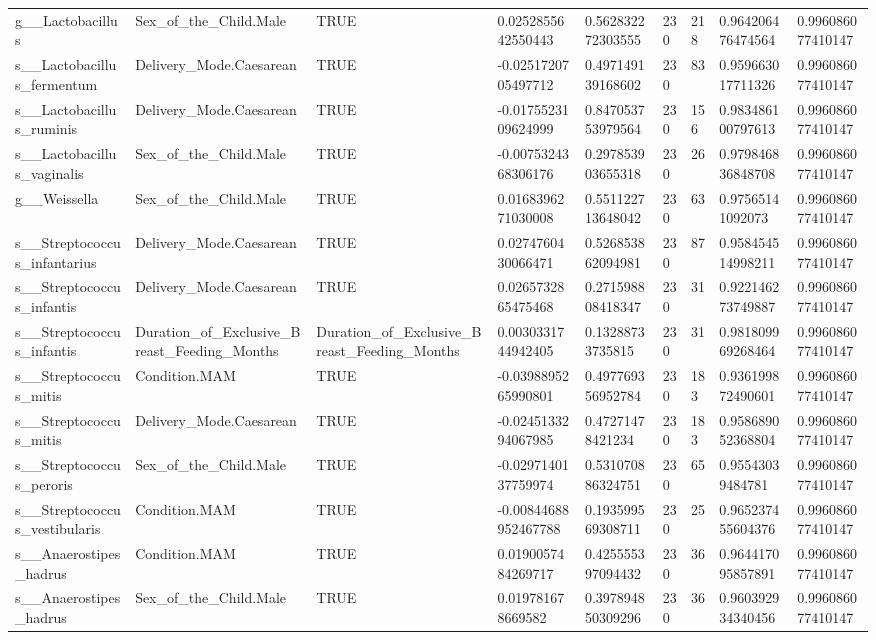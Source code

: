 \begin{longtable}{lllllllll}
g\_\_Lactobacillus & Sex\_of\_the\_Child.Male & TRUE & 0.0252855642550443 & 0.562832272303555 & 230 & 218 & 0.964206476474564 & 0.996086077410147 \\
s\_\_Lactobacillus\_fermentum & Delivery\_Mode.Caesarean & TRUE & -0.0251720705497712 & 0.497149139168602 & 230 & 83 & 0.959663017711326 & 0.996086077410147 \\
s\_\_Lactobacillus\_ruminis & Delivery\_Mode.Caesarean & TRUE & -0.0175523109624999 & 0.847053753979564 & 230 & 156 & 0.983486100797613 & 0.996086077410147 \\
s\_\_Lactobacillus\_vaginalis & Sex\_of\_the\_Child.Male & TRUE & -0.0075324368306176 & 0.297853903655318 & 230 & 26 & 0.979846836848708 & 0.996086077410147 \\
g\_\_Weissella & Sex\_of\_the\_Child.Male & TRUE & 0.0168396271030008 & 0.551122713648042 & 230 & 63 & 0.97565141092073 & 0.996086077410147 \\
s\_\_Streptococcus\_infantarius & Delivery\_Mode.Caesarean & TRUE & 0.0274760430066471 & 0.526853862094981 & 230 & 87 & 0.958454514998211 & 0.996086077410147 \\
s\_\_Streptococcus\_infantis & Delivery\_Mode.Caesarean & TRUE & 0.0265732865475468 & 0.271598808418347 & 230 & 31 & 0.922146273749887 & 0.996086077410147 \\
s\_\_Streptococcus\_infantis & Duration\_of\_Exclusive\_Breast\_Feeding\_Months & Duration\_of\_Exclusive\_Breast\_Feeding\_Months & 0.0030331744942405 & 0.13288733735815 & 230 & 31 & 0.981809969268464 & 0.996086077410147 \\
s\_\_Streptococcus\_mitis & Condition.MAM & TRUE & -0.0398895265990801 & 0.497769356952784 & 230 & 183 & 0.936199872490601 & 0.996086077410147 \\
s\_\_Streptococcus\_mitis & Delivery\_Mode.Caesarean & TRUE & -0.0245133294067985 & 0.47271478421234 & 230 & 183 & 0.958689052368804 & 0.996086077410147 \\
s\_\_Streptococcus\_peroris & Sex\_of\_the\_Child.Male & TRUE & -0.0297140137759974 & 0.531070886324751 & 230 & 65 & 0.95543039484781 & 0.996086077410147 \\
s\_\_Streptococcus\_vestibularis & Condition.MAM & TRUE & -0.00844688952467788 & 0.193599569308711 & 230 & 25 & 0.965237455604376 & 0.996086077410147 \\
s\_\_Anaerostipes\_hadrus & Condition.MAM & TRUE & 0.0190057484269717 & 0.425555397094432 & 230 & 36 & 0.964417095857891 & 0.996086077410147 \\
s\_\_Anaerostipes\_hadrus & Sex\_of\_the\_Child.Male & TRUE & 0.019781678669582 & 0.397894850309296 & 230 & 36 & 0.960392934340456 & 0.996086077410147 \\

\end{longtable}
